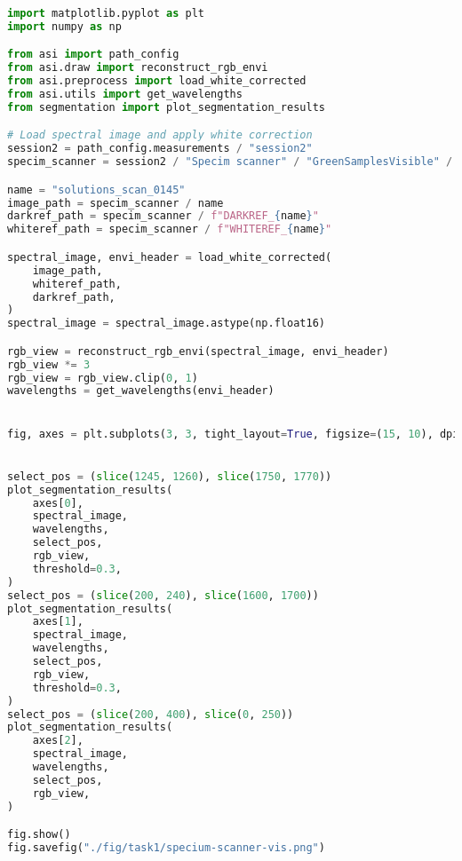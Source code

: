 \begin{lstlisting}[language=python, caption=Segmentation of green materials by Specim Scnaner in visible wavelengths, label={code:green-specim-vis}]
import matplotlib.pyplot as plt
import numpy as np

from asi import path_config
from asi.draw import reconstruct_rgb_envi
from asi.preprocess import load_white_corrected
from asi.utils import get_wavelengths
from segmentation import plot_segmentation_results

# Load spectral image and apply white correction
session2 = path_config.measurements / "session2"
specim_scanner = session2 / "Specim scanner" / "GreenSamplesVisible" / "capture"

name = "solutions_scan_0145"
image_path = specim_scanner / name
darkref_path = specim_scanner / f"DARKREF_{name}"
whiteref_path = specim_scanner / f"WHITEREF_{name}"

spectral_image, envi_header = load_white_corrected(
    image_path,
    whiteref_path,
    darkref_path,
)
spectral_image = spectral_image.astype(np.float16)

rgb_view = reconstruct_rgb_envi(spectral_image, envi_header)
rgb_view *= 3
rgb_view = rgb_view.clip(0, 1)
wavelengths = get_wavelengths(envi_header)


fig, axes = plt.subplots(3, 3, tight_layout=True, figsize=(15, 10), dpi=80)


select_pos = (slice(1245, 1260), slice(1750, 1770))
plot_segmentation_results(
    axes[0],
    spectral_image,
    wavelengths,
    select_pos,
    rgb_view,
    threshold=0.3,
)
select_pos = (slice(200, 240), slice(1600, 1700))
plot_segmentation_results(
    axes[1],
    spectral_image,
    wavelengths,
    select_pos,
    rgb_view,
    threshold=0.3,
)
select_pos = (slice(200, 400), slice(0, 250))
plot_segmentation_results(
    axes[2],
    spectral_image,
    wavelengths,
    select_pos,
    rgb_view,
)

fig.show()
fig.savefig("./fig/task1/specium-scanner-vis.png")
\end{lstlisting}